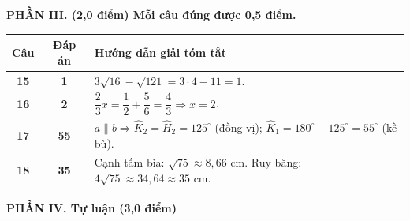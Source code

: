 \documentclass[11pt,a4paper]{article}
\begin{document}
\vspace{2.5mm}
\noindent\textbf{\large PHẦN III. (2,0 điểm) Mỗi câu đúng được 0,5 điểm.}
\vspace{1mm}

\noindent
\begin{tabularx}{\linewidth}{|c|c|X|}
\hline
\textbf{Câu} & \textbf{Đáp án} & \textbf{Hướng dẫn giải tóm tắt} \\ \hline
\textbf{15} & \textbf{1} & $3\sqrt{16} - \sqrt{121} = 3 \cdot 4 - 11 = 1$. \\ \hline
\textbf{16} & \textbf{2} & $\dfrac{2}{3}x = \dfrac{1}{2} + \dfrac{5}{6} = \dfrac{4}{3} \Rightarrow x = 2$. \\ \hline
\textbf{17} & \textbf{55} & $a \parallel b \Rightarrow \widehat{K}_2 = \widehat{H}_2 = 125^\circ$ (đồng vị); $\widehat{K}_1 = 180^\circ - 125^\circ = 55^\circ$ (kề bù). \\ \hline
\textbf{18} & \textbf{35} & Cạnh tấm bìa: $\sqrt{75} \approx 8,66\text{ cm}$. Ruy băng: $4\sqrt{75} \approx 34,64 \approx 35\text{ cm}$. \\ \hline
\end{tabularx}

\vspace{2.5mm}
\noindent\textbf{\large PHẦN IV. Tự luận (3,0 điểm)}
\vspace{1mm}
\end{document}
